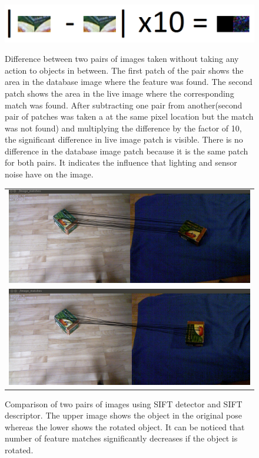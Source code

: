 \begin{figure}
\centering

{\includegraphics[width=1\columnwidth]{figures/patches.png}}

\caption{Difference between two pairs of images taken without taking any action to objects in between. The first patch of the pair shows the area in the database image where the feature was found. The second patch shows the area in the live image where the corresponding match was found. After subtracting one pair from another(second pair of patches was taken a at the same pixel location but the match was not found) and multiplying the difference by the factor of 10, the significant difference in live image patch is visible. There is no difference in the database image patch because it is the same patch for both pairs.  It indicates the influence that lighting and sensor noise have on the image. }
\label{fig:patches}
\end{figure}

\begin{figure}
\centering
    \begin{tabular}{c}
 

\includegraphics[width=0.7\columnwidth]{figures/sift-gpu-no-rotation.png}\\
\includegraphics[width=0.7\columnwidth]{figures/siftgpu-rotation.png}\\
    \end{tabular}


\caption{Comparison of two pairs of images using SIFT detector and SIFT descriptor. The upper image shows the object in the original pose whereas the lower shows the rotated object. It can be noticed that number of feature matches significantly decreases if the object is rotated. }
\label{fig:sift-features}
\end{figure}

